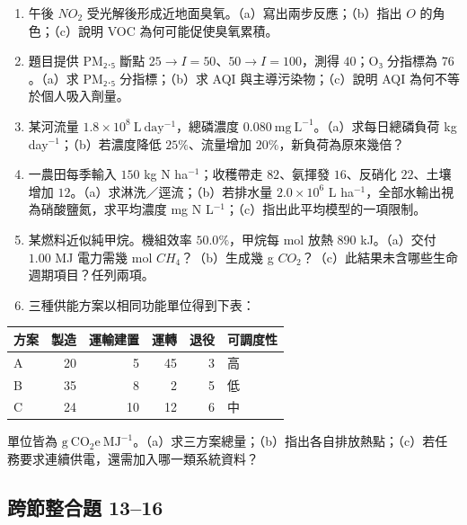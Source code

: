 \documentclass[11pt,a4paper]{article}
\newcounter{none}
\providecommand{\tightlist}{%
  \setlength{\itemsep}{0pt}\setlength{\parskip}{0pt}}
\begin{document}
\begin{enumerate}
\def\labelenumi{\arabic{enumi}.}
\setcounter{enumi}{6}
\tightlist
\item
  午後 \(NO_2\) 受光解後形成近地面臭氧。（a）寫出兩步反應；（b）指出 \(O\) 的角色；（c）說明 VOC 為何可能促使臭氧累積。
\item
  題目提供 PM₂.₅ 斷點 \(25\to I=50\)、\(50\to I=100\)，測得 \(40\)；O₃ 分指標為 \(76\)。（a）求 PM₂.₅ 分指標；（b）求 AQI 與主導污染物；（c）說明 AQI 為何不等於個人吸入劑量。
\item
  某河流量 \(1.8\times10^8\ \mathrm{L\ day^{-1}}\)，總磷濃度 \(0.080\ \mathrm{mg\ L^{-1}}\)。（a）求每日總磷負荷 kg day\(^{-1}\)；（b）若濃度降低 \(25\%\)、流量增加 \(20\%\)，新負荷為原來幾倍？
\item
  一農田每季輸入 \(150\) kg N ha\(^{-1}\)；收穫帶走 \(82\)、氨揮發 \(16\)、反硝化 \(22\)、土壤增加 \(12\)。（a）求淋洗／逕流；（b）若排水量 \(2.0\times10^6\) L ha\(^{-1}\)，全部水輸出視為硝酸鹽氮，求平均濃度 mg N L\(^{-1}\)；（c）指出此平均模型的一項限制。
\item
  某燃料近似純甲烷。機組效率 \(50.0\%\)，甲烷每 mol 放熱 \(890\) kJ。（a）交付 \(1.00\) MJ 電力需幾 mol \(CH_4\)？（b）生成幾 g \(CO_2\)？（c）此結果未含哪些生命週期項目？任列兩項。
\item
  三種供能方案以相同功能單位得到下表：
\end{enumerate}

{\def\LTcaptype{none} %
\begin{longtable}[]{@{}lrrrrl@{}}
\toprule\noalign{}
方案 & 製造 & 運輸建置 & 運轉 & 退役 & 可調度性 \\
\midrule\noalign{}
\endhead
\bottomrule\noalign{}
\endlastfoot
A & 20 & 5 & 45 & 3 & 高 \\
B & 35 & 8 & 2 & 5 & 低 \\
C & 24 & 10 & 12 & 6 & 中 \\
\end{longtable}
}

單位皆為 \(\mathrm{g\ CO_2e\ MJ^{-1}}\)。（a）求三方案總量；（b）指出各自排放熱點；（c）若任務要求連續供電，還需加入哪一類系統資料？

\subsection{跨節整合題 13--16}\label{ux8de8ux7bc0ux6574ux5408ux984c-1316}
\end{document}
